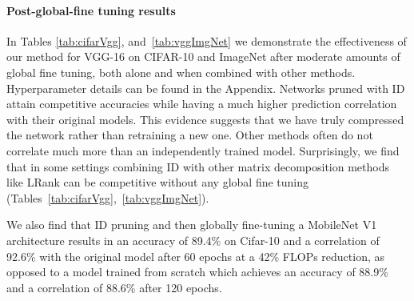 

\paragraph{Post-global-fine tuning results}
In Tables \ref{tab:cifarVgg}, and~\ref{tab:vggImgNet} we demonstrate the effectiveness of our method for VGG-16 on CIFAR-10 and ImageNet after moderate amounts of global fine tuning, both alone and when combined with other methods. 
Hyperparameter details can be found in the Appendix. 
Networks pruned with ID attain competitive accuracies while having a much higher prediction correlation with their original models.
This evidence suggests that we have truly compressed the network rather than retraining a new one.
Other methods often do not correlate much more than an independently trained model.
Surprisingly, we find that in some settings combining ID with other matrix decomposition methods like LRank\cite{idel2020lrank} can be competitive without any global fine tuning (Tables~\ref{tab:cifarVgg},~\ref{tab:vggImgNet}).

We also find that ID pruning and then globally fine-tuning a MobileNet V1 architecture results in an accuracy of 89.4\% on Cifar-10 and a correlation of 92.6\% with the original model after 60 epochs at a 42\% FLOPs reduction, as opposed to a model trained from scratch which achieves an accuracy of 88.9\% and a correlation of 88.6\% after 120 epochs.  



